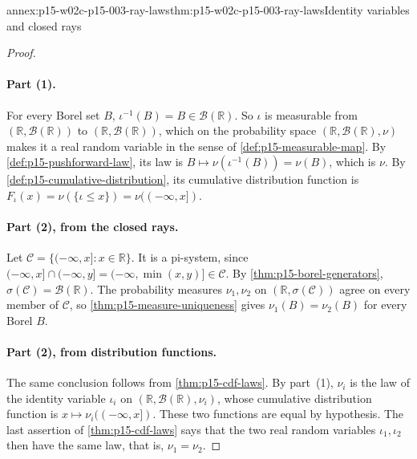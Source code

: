 \begin{annexitem}{annex:p15-w02c-p15-003-ray-laws}{thm:p15-w02c-p15-003-ray-laws}{Identity variables and closed rays}
\begin{proof}
\paragraph{Part (1).}
For every Borel set \(B\), \(\iota^{-1}(B)=B\in\mathcal B(\mathbb R)\).
So \(\iota\) is measurable from \((\mathbb R,\mathcal B(\mathbb R))\) to
\((\mathbb R,\mathcal B(\mathbb R))\), which on the probability space
\((\mathbb R,\mathcal B(\mathbb R),\nu)\) makes it a real random
variable in the sense of \cref{def:p15-measurable-map}. By
\cref{def:p15-pushforward-law}, its law is
\(B\mapsto\nu(\iota^{-1}(B))=\nu(B)\), which is \(\nu\). By
\cref{def:p15-cumulative-distribution}, its cumulative distribution
function is \(F_\iota(x)=\nu(\{\iota\leq x\})=\nu((-\infty,x])\).

\paragraph{Part (2), from the closed rays.}
Let \(\mathcal C=\{(-\infty,x]:x\in\mathbb R\}\). It is a pi-system,
since \((-\infty,x]\cap(-\infty,y]=(-\infty,\min(x,y)]\in\mathcal C\).
By \cref{thm:p15-borel-generators},
\(\sigma(\mathcal C)=\mathcal B(\mathbb R)\). The probability measures
\(\nu_1,\nu_2\) on \((\mathbb R,\sigma(\mathcal C))\) agree on every
member of \(\mathcal C\), so \cref{thm:p15-measure-uniqueness} gives
\(\nu_1(B)=\nu_2(B)\) for every Borel \(B\).

\paragraph{Part (2), from distribution functions.}
The same conclusion follows from \cref{thm:p15-cdf-laws}. By part~(1),
\(\nu_i\) is the law of the identity variable \(\iota_i\) on
\((\mathbb R,\mathcal B(\mathbb R),\nu_i)\), whose cumulative
distribution function is \(x\mapsto\nu_i((-\infty,x])\). These two
functions are equal by hypothesis. The last assertion of
\cref{thm:p15-cdf-laws} says that the two real random variables
\(\iota_1,\iota_2\) then have the same law, that is, \(\nu_1=\nu_2\).


\end{proof}
\end{annexitem}
